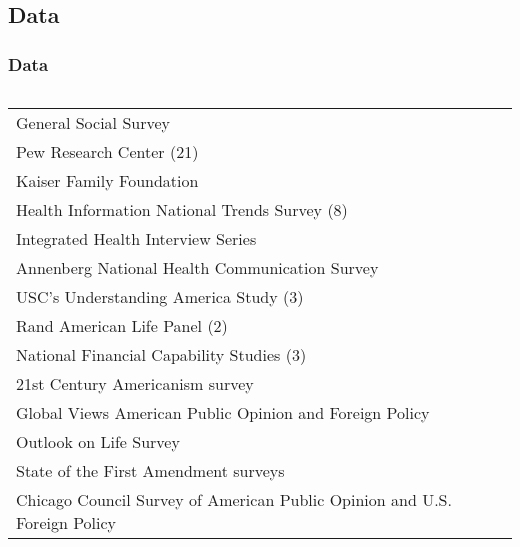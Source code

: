 \documentclass[pdf]{beamer}
\begin{document}
\subsection{Data}
\begin{frame}
\frametitle{Data}
  \begin{columns}
      \begin{tabular}{l}  %
        \hline   %
        General Social Survey           \\
        Pew Research Center (21)           \\
        Kaiser Family Foundation        \\
        Health Information National Trends Survey (8) \\
        Integrated Health Interview Series \\
        Annenberg National Health Communication Survey \\
        USC's Understanding America Study (3) \\
        Rand American Life Panel (2)  \\
        National Financial Capability Studies (3) \\
        21st Century Americanism survey \\
        Global Views American Public Opinion and Foreign Policy \\
        Outlook on Life Survey \\
        State of the First Amendment surveys \\
        Chicago Council Survey of American Public Opinion and U.S. Foreign Policy \\
        \hline  %
        \end{tabular}
   \end{columns}
\end{frame}
\end{document}

